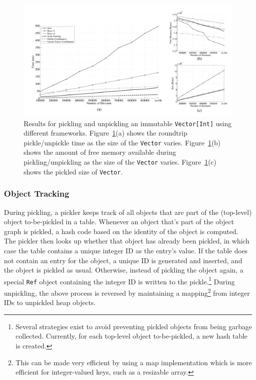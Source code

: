 \documentclass[10pt]{sigplanconf}
\theoremstyle{definition}
\theoremstyle{definition}
\begin{document}
\begin{figure}[ht!]
 \centering
 \includegraphics[width=\textwidth]{travInt-all.pdf}
 \caption{Results for pickling and unpickling an immutable
   \texttt{Vector[Int]} using different frameworks. Figure~\ref{fig:results-vector}(a) shows the roundtrip pickle/unpickle time as the size of the \texttt{Vector} varies. Figure~\ref{fig:results-vector}(b) shows the amount of free memory available during pickling/unpickling as the size of the \texttt{Vector} varies. Figure~\ref{fig:results-vector}(c) shows the pickled size of \texttt{Vector}.}
 \label{fig:results-vector}
\end{figure}

\subsubsection{Object Tracking}
\label{sec:object-tracking}

During pickling, a pickler keeps track of all objects that are part of the
(top-level) object to-be-pickled in a table. Whenever an object that's part of
the object graph is pickled, a hash code based on the identity of the object
is computed. The pickler then looks up whether that object has already been
pickled, in which case the table contains a unique integer ID as the entry's
value. If the table does not contain an entry for the object, a unique ID is
generated and inserted, and the object is pickled as usual. Otherwise, instead
of pickling the object again, a special \verb|Ref| object containing the integer ID
is written to the pickle.\footnote{Several strategies exist to avoid preventing pickled objects from being garbage collected. Currently, for each top-level object to-be-pickled, a new hash table is created.}
During unpickling, the above process is reversed by maintaining a
mapping\footnote{This can be made very efficient by using a map implementation which is more efficient for integer-valued keys, such as a resizable array.}
from integer IDs to unpickled heap objects.
\end{document}
